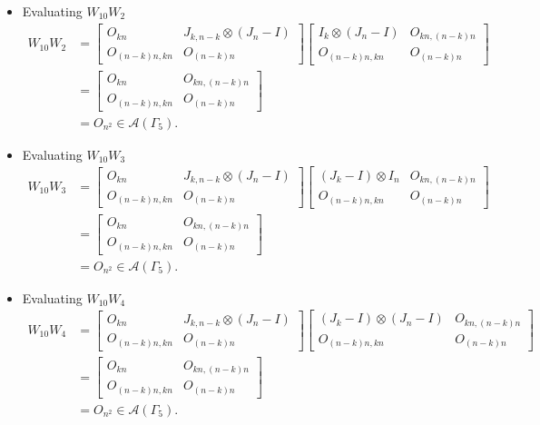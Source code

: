 \begin{itemize}
\item Evaluating $W_{10}W_{2}$
\begin{align*}
    W_{10}W_2
    &= \begin{bmatrix}
        O_{kn} & J_{k,n-k} \otimes (J_n-I) \\
        O_{(n-k)n,kn} & O_{(n-k)n}
    \end{bmatrix}
    \begin{bmatrix}
        I_{k}\otimes(J_n-I) & O_{kn, (n-k)n} \\
        O_{(n-k)n,kn} & O_{(n-k)n}
    \end{bmatrix}\\
    &= \begin{bmatrix}
        O_{kn} & O_{kn, (n-k)n} \\
        O_{(n-k)n,kn} & O_{(n - k)n}
    \end{bmatrix}\\
    &= O_{n^2} \in\mathcal{A}(\Gamma_5).
\end{align*}

\item Evaluating $W_{10}W_{3}$
\begin{align*}
    W_{10}W_3
    &= \begin{bmatrix}
        O_{kn} & J_{k,n-k} \otimes (J_n-I) \\
        O_{(n-k)n,kn} & O_{(n-k)n}
    \end{bmatrix}
    \begin{bmatrix}
        (J_{k}-I)\otimes I_n & O_{kn, (n-k)n} \\
        O_{(n-k)n,kn} & O_{(n-k)n}
    \end{bmatrix}\\
    &= \begin{bmatrix}
        O_{kn} & O_{kn, (n-k)n} \\
        O_{(n-k)n,kn} & O_{(n - k)n}
    \end{bmatrix}\\
    &= O_{n^2} \in\mathcal{A}(\Gamma_5).
\end{align*}

\item Evaluating $W_{10}W_{4}$
\begin{align*}
    W_{10}W_4
    &= \begin{bmatrix}
        O_{kn} & J_{k,n-k} \otimes (J_n-I) \\
        O_{(n-k)n,kn} & O_{(n-k)n}
    \end{bmatrix}
    \begin{bmatrix}
        (J_{k}-I)\otimes (J_n-I) & O_{kn, (n-k)n} \\
        O_{(n-k)n,kn} & O_{(n-k)n}
    \end{bmatrix}\\
    &= \begin{bmatrix}
        O_{kn} & O_{kn, (n-k)n} \\
        O_{(n-k)n,kn} & O_{(n - k)n}
    \end{bmatrix}\\
    &= O_{n^2} \in\mathcal{A}(\Gamma_5).
\end{align*}


\end{itemize}
